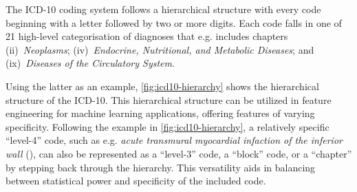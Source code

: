 The \ac{ICD-10} coding system follows a hierarchical structure 
with every code beginning with a letter followed by two or more digits.
Each code falls in one of 21 high-level categorisation of diagnoses 
that e.g.  includes chapters
(ii)~\emph{Neoplasms};
(iv)~\emph{Endocrine, Nutritional, and Metabolic Diseases};
and (ix)~\emph{Diseases of the Circulatory System}.

Using the latter as an example, 
\cref{fig:icd10-hierarchy} shows the hierarchical structure of the
\ac{ICD-10}.
This hierarchical structure can be utilized in feature engineering for
machine learning applications, offering features of varying specificity. 
Following the example in \cref{fig:icd10-hierarchy},
a relatively specific \enquote{level-4} code, such as e.g. 
\emph{acute transmural myocardial infaction of the inferior wall}
(), can also be represented as a \enquote{level-3} code,
a \enquote{block} code, or a \enquote{chapter} by stepping back
through the hierarchy.
This versatility aids in balancing between statistical power
and specificity of the included code.

